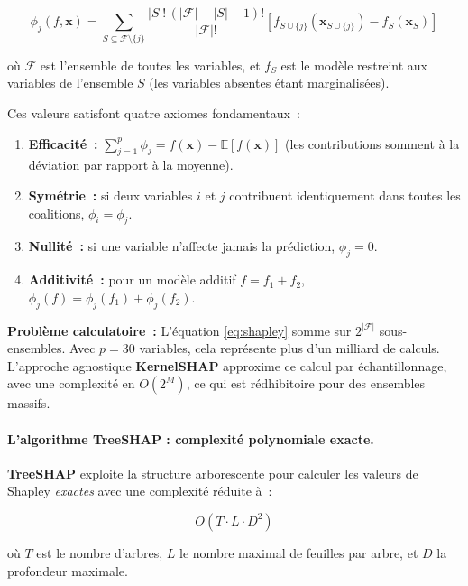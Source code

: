 \begin{equation}
  \phi_j(f, \mathbf{x}) = \sum_{S \subseteq \mathcal{F} \setminus \{j\}}
  \frac{|S|!\,(|\mathcal{F}| - |S| - 1)!}{|\mathcal{F}|!}
  \left[f_{S \cup \{j\}}(\mathbf{x}_{S \cup \{j\}}) - f_S(\mathbf{x}_S)\right]
  \label{eq:shapley}
\end{equation}

où $\mathcal{F}$ est l'ensemble de toutes les variables, et $f_S$ est le modèle restreint
aux variables de l'ensemble $S$ (les variables absentes étant marginalisées).

Ces valeurs satisfont quatre axiomes fondamentaux~:
\begin{enumerate}
  \item \textbf{Efficacité~:} $\sum_{j=1}^{p} \phi_j = f(\mathbf{x}) - \mathbb{E}[f(\mathbf{x})]$ (les contributions somment à la déviation par rapport à la moyenne).
  \item \textbf{Symétrie~:} si deux variables $i$ et $j$ contribuent identiquement dans toutes les coalitions, $\phi_i = \phi_j$.
  \item \textbf{Nullité~:} si une variable n'affecte jamais la prédiction, $\phi_j = 0$.
  \item \textbf{Additivité~:} pour un modèle additif $f = f_1 + f_2$, $\phi_j(f) = \phi_j(f_1) + \phi_j(f_2)$.
\end{enumerate}

\textbf{Problème calculatoire~:} L'équation \eqref{eq:shapley} somme sur $2^{|\mathcal{F}|}$
sous-ensembles. Avec $p = 30$ variables, cela représente plus d'un milliard de calculs.
L'approche agnostique \textbf{KernelSHAP} approxime ce calcul par échantillonnage, avec
une complexité en $O(2^M)$, ce qui est rédhibitoire pour des ensembles massifs.

\paragraph{L'algorithme TreeSHAP : complexité polynomiale exacte.}

\textbf{TreeSHAP} exploite la structure arborescente pour calculer les valeurs de Shapley
\textit{exactes} avec une complexité réduite à~:

\begin{equation}
  O(T \cdot L \cdot D^2)
  \label{eq:complexite_treeshap}
\end{equation}

où $T$ est le nombre d'arbres, $L$ le nombre maximal de feuilles par arbre, et $D$
la profondeur maximale.


